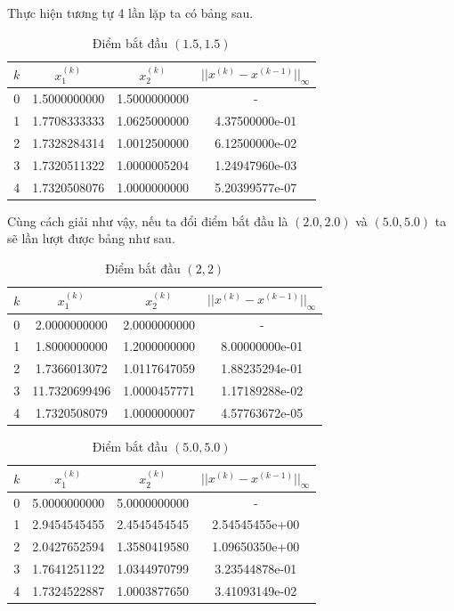 Thực hiện tương tự 4 lần lặp ta có bảng sau. 

\begin{table}[h]
\centering
\caption{Điểm bắt đầu $(1.5,1.5)$}

\begin{tabular}{|c|c|c|c|}
\hline
\textbf{$k$} & \textbf{$x_{1}^{(k)}$} & \textbf{$x_{2}^{(k)}$} & \textbf{$||x^{(k)} - x^{(k-1)}||_\infty$} \\
\hline
0 & 1.5000000000 & 1.5000000000 &  - \\
1 & 1.7708333333 & 1.0625000000 &  4.37500000e-01 \\
2 &1.7328284314 & 1.0012500000 &  6.12500000e-02 \\
3 &1.7320511322 & 1.0000005204 &  1.24947960e-03 \\
4 & 1.7320508076 & 1.0000000000 & 5.20399577e-07 \\
\hline
\end{tabular}
\end{table}

Cùng cách giải như vậy, nếu ta đổi điểm bắt đầu là $(2.0,2.0)$ và $(5.0,5.0)$
ta sẽ lần lượt được bảng như sau.


\begin{table}[h]
\centering
\caption{Điểm bắt đầu $(2,2)$}
\begin{tabular}{|c|c|c|c|}
\hline
\textbf{$k$} & \textbf{$x_{1}^{(k)}$} & \textbf{$x_{2}^{(k)}$} & \textbf{$||x^{(k)} - x^{(k-1)}||_\infty$} \\
\hline
0 & 2.0000000000 & 2.0000000000 &  - \\
1 &1.8000000000 & 1.2000000000 &8.00000000e-01 \\
2 &1.7366013072 & 1.0117647059 &1.88235294e-01 \\
3 &11.7320699496 & 1.0000457771 &1.17189288e-02 \\
4 & 1.7320508079 & 1.0000000007 &4.57763672e-05 \\
\hline
\end{tabular}    
\end{table}
\begin{table}[H]
\centering
\caption{Điểm bắt đầu $(5.0,5.0)$}
\begin{tabular}{|c|c|c|c|}
\hline
\textbf{$k$} & \textbf{$x_{1}^{(k)}$} & \textbf{$x_{2}^{(k)}$} & \textbf{$||x^{(k)} - x^{(k-1)}||_\infty$} \\
\hline
0 & 5.0000000000 & 5.0000000000 &  - \\
1 &2.9454545455 & 2.4545454545 &2.54545455e+00 \\
2 &2.0427652594 & 1.3580419580 &1.09650350e+00 \\
3 &1.7641251122 & 1.0344970799 &3.23544878e-01 \\
4 & 1.7324522887 & 1.0003877650 &3.41093149e-02 \\
\hline
\end{tabular}

\end{table}

